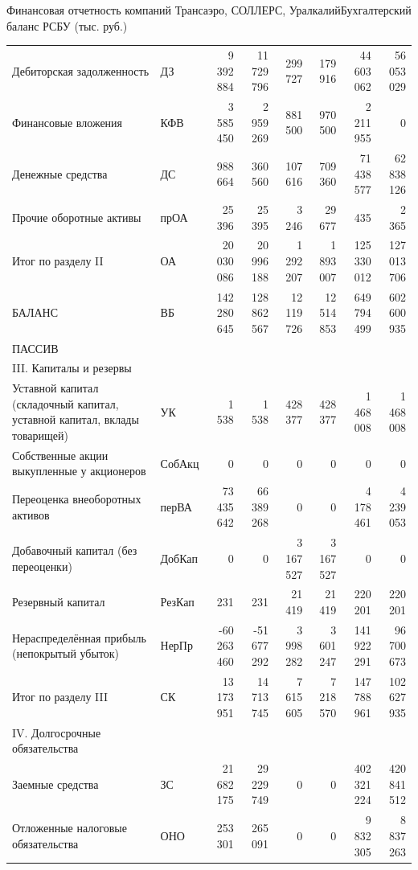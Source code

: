\documentclass[_Banking_p2.tex]{subfiles}
\begin{document}
\begin{frame}[shrink=70]{Финансовая отчетность компаний Трансаэро, СОЛЛЕРС, Уралкалий}{Бухгалтерский баланс РСБУ (тыс. руб.)}
\begin{table}[htbp]
\begin{tabular}{L{8cm} lrrrrrr}
Дебиторская задолженность & ДЗ    & 9 392 884 & 11 729 796 & 299 727 & 179 916 & 44 603 062 & 56 053 029 \\
Финансовые вложения & КФВ   & 3 585 450 & 2 959 269 & 881 500 & 970 500 & 2 211 955 & 0 \\
Денежные средства & ДС    & 988 664 & 360 560 & 107 616 & 709 360 & 71 438 577 & 62 838 126 \\
Прочие оборотные активы & прОА  & 25 396 & 25 395 & 3 246 & 29 677 & 435   & 2 365 \\
Итог по разделу II & ОА    & 20 030 086 & 20 996 188 & 1 292 207 & 1 893 007 & 125 330 012 & 127 013 706 \\
БАЛАНС & ВБ    & 142 280 645 & 128 862 567 & 12 119 726 & 12 514 853 & 649 794 499 & 602 600 935 \\
ПАССИВ &       & \textbf{} & \textbf{} & \textbf{} & \textbf{} & \textbf{} & \textbf{} \\
III. Капиталы и резервы &       & \textbf{} & \textbf{} & \textbf{} & \textbf{} & \textbf{} & \textbf{} \\
Уставной капитал (складочный капитал, уставной капитал, вклады товарищей) & УК    & 1 538 & 1 538 & 428 377 & 428 377 & 1 468 008 & 1 468 008 \\
Собственные акции выкупленные у акционеров & СобАкц & 0     & 0     & 0     & 0     & 0     & 0 \\
Переоценка внеоборотных активов & перВА & 73 435 642 & 66 389 268 & 0     & 0     & 4 178 461 & 4 239 053 \\
Добавочный капитал (без переоценки) & ДобКап & 0     & 0     & 3 167 527 & 3 167 527 & 0     & 0 \\
Резервный капитал & РезКап & 231   & 231   & 21 419 & 21 419 & 220 201 & 220 201 \\
Нераспределённая прибыль (непокрытый убыток) & НерПр & -60 263 460 & -51 677 292 & 3 998 282 & 3 601 247 & 141 922 291 & 96 700 673 \\
Итог по разделу III & СК    & 13 173 951 & 14 713 745 & 7 615 605 & 7 218 570 & 147 788 961 & 102 627 935 \\
IV. Долгосрочные обязательства &       & \textbf{} & \textbf{} & \textbf{} & \textbf{} & \textbf{} & \textbf{} \\
Заемные средства & ЗС    & 21 682 175 & 29 229 749 & 0     & 0     & 402 321 224 & 420 841 512 \\
Отложенные налоговые обязательства & ОНО   & 253 301 & 265 091 & 0     & 0     & 9 832 305 & 8 837 263 \\

\end{tabular}
\end{table}
\end{frame}
\end{document}
